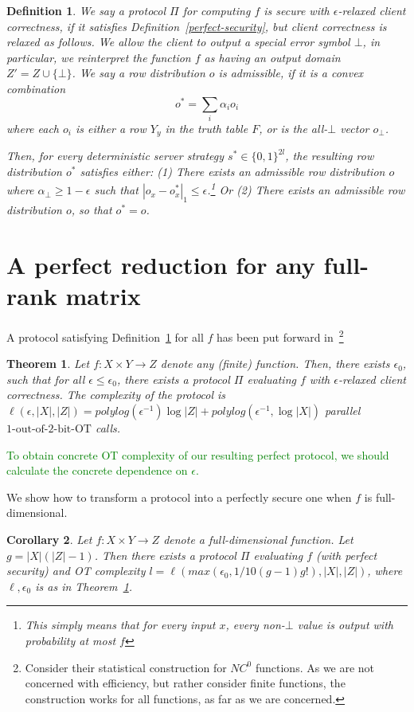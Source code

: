 \documentclass[a4paper]{article}
\newtheorem{definition}{Definition}[section]
\newtheorem{theorem}{Theorem}[section]
\newtheorem{corollary}[theorem]{Corollary}
\newcommand{\OT}[2]{#1\text{-out-of-}#2\text{-bit-OT}}
\newcommand{\atodo}[1]{\textcolor{green}{#1}}
\begin{document}
\begin{definition}\label{weak-security}
We say a protocol $\Pi$ for computing $f$ is secure with $\epsilon$-relaxed client correctness, if it satisfies Definition~\ref{perfect-security}, but client correctness is relaxed as follows. We allow the client to output a special error symbol $\bot$, in particular, we reinterpret the function $f$ as having an output domain $Z'=Z\cup\{\bot\}$. 
We say a row distribution $o$ is admissible, if it is a convex combination 
\[o^* = \sum_i\alpha_io_i\]
where each $o_i$ is either a row $Y_y$ in the truth table $F$, or is the all-$\bot$ vector $o_\bot$. 

Then, for every deterministic server strategy $s^*\in\{0,1\}^{2l}$, the resulting row distribution $o^*$ satisfies either:
(1) There exists an admissible row distribution $o$ where $\alpha_\bot\geq 1-\epsilon$ such that $|o_x-o^*_x|_1\leq \epsilon$.\footnote{This simply means that for every input $x$, every non-$\bot$ value is output with probability at most $f$} Or  (2)
There exists an admissible row distribution $o$, so that $o^* = o$.
\end{definition}

\section{A perfect reduction for any full-rank matrix}
A protocol satisfying Definition~\ref{weak-security} for all $f$ has been put forward in~\cite{IKOPS}\footnote{Consider their statistical construction for $NC^0$ functions. As we are not concerned with efficiency, but rather consider finite functions, the construction works for all functions, as far as we are concerned.}

\begin{theorem}\label{thm-IVWD}
Let $f:X\times Y\rightarrow Z$ denote any (finite) function.
Then, there exists $\epsilon_0$, such that for all $\epsilon \leq \epsilon_0$, there exists a protocol $\Pi$  evaluating $f$ with $\epsilon$-relaxed client correctness. 
The complexity of the protocol is $\ell(\epsilon,|X|,|Z|)=polylog(\epsilon^{-1})\log|Z|+polylog(\epsilon^{-1},\log{|X|})$ parallel $\OT{1}{2}$ calls.
\end{theorem}
\atodo{To obtain concrete OT complexity of our resulting perfect protocol, we should calculate the concrete dependence on $\epsilon$.} 

We show how to transform a protocol into a perfectly secure one when $f$ is full-dimensional. 
\begin{corollary}
Let $f:X\times Y\rightarrow Z$ denote a full-dimensional function.
Let $g=|X|(|Z|-1)$.
Then there exists a protocol $\Pi$ evaluating $f$ (with perfect security)
and OT complexity $l=\ell(max(\epsilon_0,1/10(g-1)g!), |X|, |Z|)$, where $\ell,\epsilon_0$ is as in Theorem~\ref{thm-IVWD}.

\end{corollary}
\end{document}
